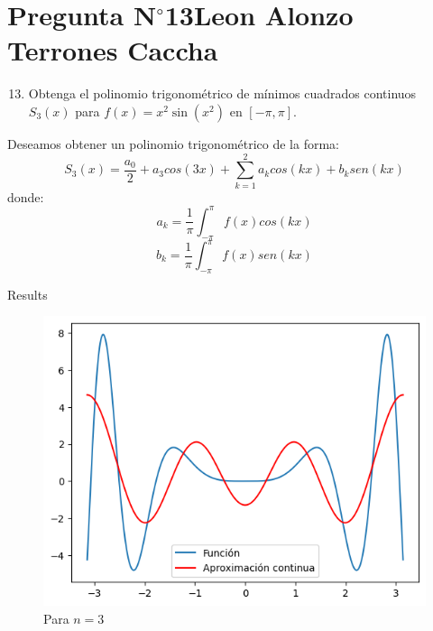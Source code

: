 \section{Pregunta N$^{\circ}$13\qquad Leon Alonzo Terrones Caccha}

\begin{frame}
    \begin{enumerate}\setcounter{enumi}{12}
        \item

              Obtenga el polinomio trigonométrico de mínimos
              cuadrados continuos $S_{3}\left(x\right)$ para
              \begin{math}
                  f\left(x\right)=
                  x^{2}\sin
                  \left(x^{2}\right)
              \end{math}
              en
              \begin{math}
                  \left[-\pi,\pi\right]
              \end{math}.
    \end{enumerate}

    \begin{solution}
        Deseamos obtener un polinomio trigonométrico de la forma:
        \[S_{3}\left(x\right)=\frac{a_{0}}{2}+a_{3}cos(3x)+\sum_{k=1}^{2}{a_kcos(kx)+b_ksen(kx)}\]
        donde:
        \[a_k=\frac{1}{\pi}\int_{-\pi}^{\pi}{f(x)cos(kx)}\]
        \[b_k=\frac{1}{\pi}\int_{-\pi}^{\pi}{f(x)sen(kx)}\]
    \end{solution}
\end{frame}
\begin{frame}{Results}
    \begin{figure}
        \centering
        \includegraphics[width=.5\paperwidth]{p13-Aprox-continua.png}
        \caption{Para $n=3$}
        \label{fig:enter-label}
    \end{figure}
\end{frame}
